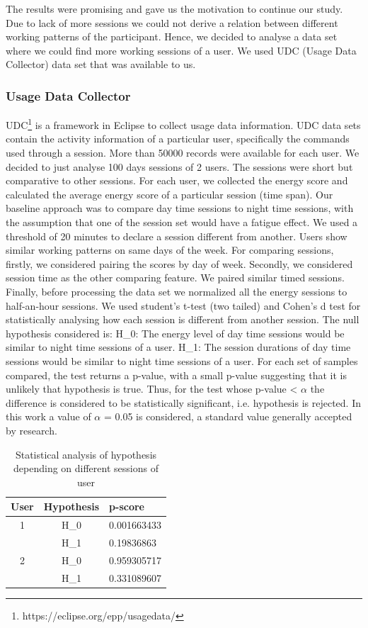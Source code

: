 \documentclass{acm_proc_article-sp}
\begin{document}
The results were promising and gave us the motivation to continue our study. Due
to lack of more sessions we could not derive a relation between different
working patterns of the participant. Hence, we decided to analyse a data set
where we could find more working sessions of a user. We used UDC (Usage Data
Collector) data set that was available to us.\\

\subsubsection{Usage Data Collector}
UDC\footnote{https://eclipse.org/epp/usagedata/} is a framework in Eclipse to
collect usage data information. UDC data sets contain the activity information
of a particular user, specifically the commands used through a session. More
than 50000 records were available for each user. We decided to just analyse
100 days sessions of 2 users. The sessions were short but comparative to other
sessions.
For each user, we collected the energy score and calculated the average energy
score of a particular session (time span). Our baseline approach was to
compare day time sessions to night time sessions, with the assumption that one
of the session set would have a fatigue effect. We used a threshold of 20
minutes to declare a session different from another. Users show similar working
patterns on same days of the week. For comparing sessions, firstly, we
considered pairing the scores by day of week. Secondly, we considered session
time as the other comparing feature. We paired similar timed sessions. Finally,
before processing the data set we normalized all the energy sessions to
half-an-hour sessions. We used student's t-test (two tailed) and Cohen's d test for
statistically analysing how each session is different from another session. The null
hypothesis considered is: H\_0: The energy level of day time sessions would be
similar to night time sessions of a user. H\_1: The session durations of day
time sessions would be similar to night time sessions of a user. For each set of
samples compared, the test returns a p-value, with a small p-value suggesting
that it is unlikely that hypothesis is true. Thus, for the test whose p-value <
$\alpha$ the difference is considered to be statistically significant, i.e.
hypothesis is rejected. In this work a value of $\alpha$ = 0.05 is considered, a
standard value generally accepted by research.
	\begin{table}
		\centering
		\caption{Statistical analysis of hypothesis depending on different sessions of
		user} \begin{tabular}{|c|c|l|} \hline
			User&Hypothesis&p-score\\ \hline
			1&H\_0 & 0.001663433\\ \hline
			&H\_1 & 0.19836863\\ \hline
			2&H\_0 & 0.959305717\\ \hline
			&H\_1 & 0.331089607\\ \hline
		\end{tabular}
		\label{table:day/night}
	\end{table}
\end{document}
